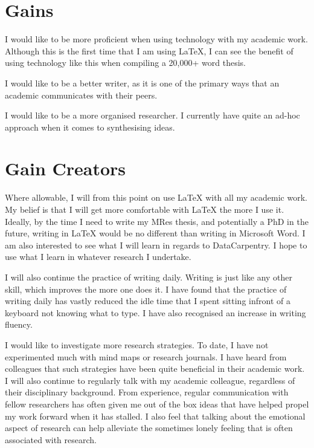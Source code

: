 \documentclass{article}
\begin{document}
\section{Gains}

I would like to be more proficient when using technology with my academic work. Although this is the first time that I am using LaTeX, I can see the benefit of using technology like this when compiling a 20,000+ word thesis.

I would like to be a better writer, as it is one of the primary ways that an academic communicates with their peers.

I would like to be a more organised researcher. I currently have quite an ad-hoc approach when it comes to synthesising ideas.

\section{Gain Creators}

Where allowable, I will from this point on use LaTeX with all my academic work. My belief is that I will get more comfortable with LaTeX the more I use it. Ideally, by the time I need to write my MRes thesis, and potentially a PhD in the future, writing in LaTeX would be no different than writing in Microsoft Word.
I am also interested to see what I will learn in regards to DataCarpentry. I hope to use what I learn in whatever research I undertake.

I will also continue the practice of writing daily. Writing is just like any other skill, which improves the more one does it. I have found that the practice of writing daily has vastly reduced the idle time that I spent sitting infront of a keyboard not knowing what to type. I have also recognised an increase in writing fluency.

I would like to investigate more research strategies. To date, I have not experimented much with mind maps or research journals. I have heard from colleagues that such strategies have been quite beneficial in their academic work. I will also continue to regularly talk with my academic colleague, regardless of their disciplinary background. From experience, regular communication with fellow researchers has often given me out of the box ideas that have helped propel my work forward when it has stalled. I also feel that talking about the emotional aspect of research can help alleviate the sometimes lonely feeling that is often associated with research.
\end{document}
